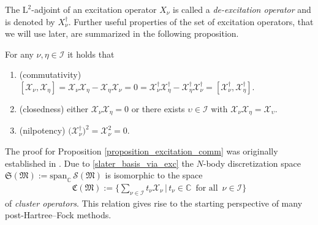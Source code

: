 \documentclass[reqno]{amsart}
\begin{document}
The $\mathrm{L}^2$-adjoint of an excitation operator $X_\nu$ is called a \textit{de-excitation operator} and is denoted by $X_\nu^\dagger$.
Further useful properties of the set of excitation operators, that we will use later, are summarized in the following proposition. 
\begin{proposition}\label{proposition_excitation_comm}
    For any $\nu, \eta \in \mathscr{I}$ it holds that 
    \begin{enumerate}
        \item (commutativity) $[\mathscr{X}_\nu,\mathscr{X}_\eta]=\mathscr{X}_\nu \mathscr{X}_\eta- \mathscr{X}_\eta \mathscr{X}_\nu = 0=\mathscr{X}^\dagger_\nu \mathscr{X}^\dagger_\eta- \mathscr{X}^\dagger_\eta \mathscr{X}^\dagger_\nu=[\mathscr{X}^\dagger_\nu,\mathscr{X}^\dagger_\eta]$.
        \item (closedness) either $\mathscr{X}_\nu \mathscr{X}_\eta=0$ or there exists $\upsilon \in \mathscr{I}$ with $\mathscr{X}_\nu \mathscr{X}_\eta=\mathscr{X}_\upsilon$.
        \item (nilpotency)  $\big(\mathscr{X}^\dagger_\nu\big)^2=\mathscr{X}_\nu^2=0$.
    \end{enumerate}
\end{proposition}
The proof for Proposition \ref{proposition_excitation_comm} was originally established in \cite{Schneider2009}. Due to \eqref{slater_basis_via_exc} the $N$-body discretization space $\mathfrak{S}(\mathfrak{M}):=\text{span}_\mathbb{C}\,\mathcal{S}(\mathfrak{M})$ is isomorphic to the space
\begin{align}
    \mathfrak{C}(\mathfrak{M}):=\Big\lbrace \sum_{\nu\in \mathscr{I}}t_\nu \mathscr{X}_\nu \,\Big|\, t_\nu\in \mathbb{C}\,\text{ for all }\, \nu\in \mathscr{I}\Big\rbrace
\end{align}
of \textit{cluster operators}. This relation gives rise to the starting perspective of many post-Hartree–Fock methods. 
\end{document}
